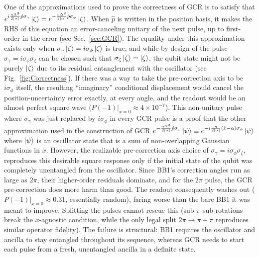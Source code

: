 \documentclass[aps,prx,showpacs,notitlepage,twocolumn,superscriptaddress,nofootinbib,preprintnumbers,floatfix,10pt, longbibliography]{revtex4-2}
\begin{document}
{One of the approximations used to prove the correctness of GCR is to satisfy that $e^{i\frac{\eta\Delta^2}{2|\alpha|}\hat p\sigma_\gamma}\ket{\zeta}=e^{-\frac{\eta\Delta^2}{2|\alpha|}\hat p\sigma_\phi}\ket{\zeta}$. When $\hat p$ is written in the position basis, it makes the RHS of this equation an error-canceling unitary of the next pulse, up to first-order in the error (see Sec.~\ref{sec:GCR}). The equality under this approximation exists only when $\sigma_\gamma\ket{\zeta}=i\sigma_\phi\ket{\zeta}$ is true, and while by design of the pulse $\sigma_\gamma=i\sigma_\phi\sigma_\zeta$ can be chosen such that $\sigma_\zeta\ket{\zeta}=\ket{\zeta}$, the qubit state might not be purely $\ket{\zeta}$ due to its residual entanglement with the oscillator (see Fig.~\ref{fig:Correctness}). If there was a way to take the pre-correction axis to be $i\sigma_\phi$ itself, the
resulting ``imaginary'' conditional displacement would cancel the
position-uncertainty error exactly, at every angle, and the readout would be an
almost perfect square wave ($P(-1)|_{x=0}\approx4\times10^{-7}$). This non-unitary pulse where $\sigma_\gamma$ was just replaced by $i\sigma_\phi$ in every GCR pulse is a proof that the other approximation used in the construction of GCR $e^{-\frac{\eta\Delta^2}{2|\alpha|}\hat p\sigma_\phi}\ket{\psi}\equiv e^{-i\frac{\eta}{2|\alpha|}(\hat x-\alpha)\sigma_\phi}\ket{\psi}$ where $\ket{\psi}$ is an oscillator state that is a sum of non-overlapping Gaussian functions in $x$. However, the realizable pre-correction axis choice of $\sigma_\gamma=i\sigma_\phi\sigma_\zeta$,
reproduces this desirable square response only if the initial state of the qubit was completely unentangled from the oscillator. Since BB1's correction
angles run as large as $2\pi$, their higher-order
residuals dominate, and for the $2\pi$ pulse, the GCR pre-correction does more harm than
good. The readout consequently washes out ($P(-1)|_{x=0}\approx0.31$, essentially
random), faring worse than the bare BB1 it was meant to improve. Splitting the pulses cannot
rescue this (sub-$\pi$ sub-rotations break the $x$-agnostic condition, while the only legal split
$2\pi\to\pi+\pi$ reproduces similar operator fidelity). The failure is structural: BB1 requires the
oscillator and ancilla to stay entangled throughout its sequence, whereas GCR needs to start each
pulse from a fresh, unentangled ancilla in a definite state. 


}
\end{document}
